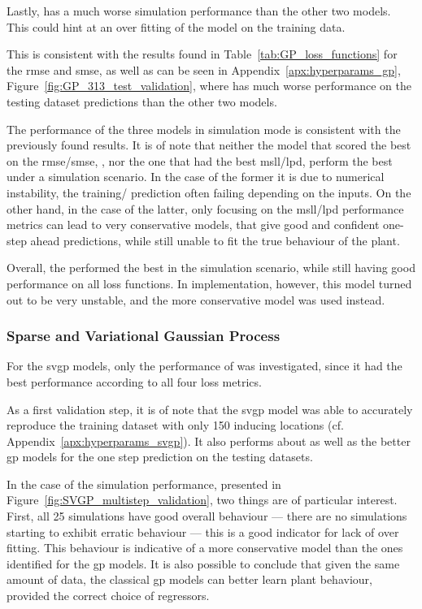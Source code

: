 Lastly,  has a much worse simulation performance than the other
two models. This could hint at an over fitting of the model on the training data.

\clearpage

This is consistent with the results found in Table~\ref{tab:GP_loss_functions}
for the \acrshort{rmse} and \acrshort{smse}, as well as can be seen in
Appendix~\ref{apx:hyperparams_gp}, Figure~\ref{fig:GP_313_test_validation},
where  has much worse performance on the testing dataset predictions
than the other two models.

The performance of the three models in simulation mode is consistent with the
previously found results. It is of note that neither the model that scored the
best on the \acrshort{rmse}/\acrshort{smse}, , nor the one that
had the best \acrshort{msll}/\acrshort{lpd}, perform the best under a simulation
scenario. In the case of the former it is due to numerical instability, the
training/ prediction often failing depending on the inputs. On the other hand,
in the case of the latter, only focusing on the \acrshort{msll}/\acrshort{lpd}
performance metrics can lead to very conservative models, that give good and
confident one-step ahead predictions, while still unable to fit the true
behaviour of the plant.

Overall, the  performed the best in the simulation scenario,
while still having good performance on all loss functions. In implementation,
however, this model turned out to be very unstable, and the more conservative
 model was used instead.

\subsubsection{Sparse and Variational Gaussian Process}

For the \acrshort{svgp} models, only the performance of  was
investigated, since it had the best performance according to all four loss
metrics. 

As a first validation step, it is of note that the \acrshort{svgp} model was
able to accurately reproduce the training dataset with only 150 inducing
locations (cf.  Appendix~\ref{apx:hyperparams_svgp}). It also performs about as
well as the better \acrshort{gp} models for the one step prediction on the
testing datasets.

In the case of the simulation performance, presented in
Figure~\ref{fig:SVGP_multistep_validation}, two things are of particular
interest. First, all 25 simulations have good overall behaviour --- there are no
simulations starting to exhibit erratic behaviour --- this is a good indicator
for lack of over fitting. This behaviour is indicative of a more conservative
model than the ones identified for the \acrshort{gp} models. It is also possible
to conclude that given the same amount of data, the classical \acrshort{gp}
models can better learn plant behaviour, provided the correct choice of
regressors.

